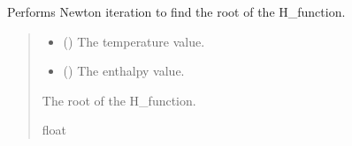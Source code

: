\documentclass[a4paper,11pt,english,openany]{sphinxmanual}
\begin{document}
\begin{fulllineitems}
\label{\detokenize{api/spyice.update_physical_values:src.spyice.update_physical_values.H_newton_iteration}}
\pysigstartsignatures
\pysiglinewithargsret
{}
{\sphinxparamcomma {}}
{}
\pysigstopsignatures
\sphinxAtStartPar
Performs Newton iteration to find the root of the H\_function.
\begin{quote}\begin{description}
\begin{itemize}
\item {} 
\sphinxAtStartPar
{} () \textendash{} The temperature value.

\item {} 
\sphinxAtStartPar
{} () \textendash{} The enthalpy value.

\end{itemize}

\sphinxAtStartPar
The root of the H\_function.

\sphinxAtStartPar
float

\sphinxAtStartPar
{} \textendash{} 

\end{description}\end{quote}

\end{fulllineitems}


\begin{fulllineitems}
\label{\detokenize{api/spyice.update_physical_values:src.spyice.update_physical_values.calculate_liquidus_temperature}}
\pysigstartsignatures
\pysiglinewithargsret
{}
{}
{}
\pysigstopsignatures
\end{fulllineitems}
\end{document}
